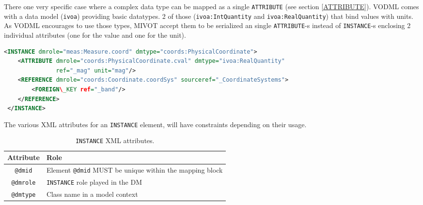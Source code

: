 There one very specific case where a complex data type can be mapped as a single \texttt{ATTRIBUTE} (see section \ref{ATTRIBUTE}). 
VODML comes with a data model (\texttt{ivoa}) providing basic datatypes. 2 of those (\texttt{ivoa:IntQuantity} 
and \texttt{ivoa:RealQuantity}) that bind values with units. 
As VODML encourages to use those types, MIVOT accept them to be serialized an single \texttt{ATTRIBUTE}-s
instead of \texttt{INSTANCE}-s enclosing 2 individual attributes (one for the value and one for the unit).

\begin{lstlisting}[caption={Example of complex data type (\texttt{ivoa:RealQuantity}) serialized 
as a single \texttt{ATTRIBUTE}  (see line~\ref{IVOA_snippet} in Appendix~\ref{appendix_A}).
The  attribute of type \texttt{ivoa:RealQuantity} is a shortcut for an 
\texttt{INSTANCE[@dmtype=ivoa:RealQuantity]} which has 2 attributes (value and unit)
},language=XML]
<INSTANCE dmrole="meas:Measure.coord" dmtype="coords:PhysicalCoordinate">
    <ATTRIBUTE dmrole="coords:PhysicalCoordinate.cval" dmtype="ivoa:RealQuantity" 
               ref="_mag" unit="mag"/>
    <REFERENCE dmrole="coords:Coordinate.coordSys" sourceref="_CoordinateSystems">
        <FOREIGN\_KEY ref="_band"/>
    </REFERENCE>
 </INSTANCE>
\end{lstlisting}   



The various XML attributes for an \texttt{INSTANCE} element, will have constraints depending on their usage.
\begin{table}[!htbp]
\small
\centering
\begin{tabulary}{\linewidth}{|c|J|}       
       \hline 
            \textbf{Attribute} & 
            \textbf {Role}\\
       \hline         \hline  
            \texttt{@dmid} & 
            Element  \texttt{@dmid}  MUST be unique within the mapping block  \\
        \hline 
            \texttt{@dmrole} & 
            \texttt{INSTANCE} role played in the DM \\
        \hline 
            \texttt{@dmtype} & 
            Class name in a model context\\
        \hline 
     \end{tabulary}
     \caption{\texttt{INSTANCE} XML attributes.} 
     \label{tbl:instance-att}
 \end{table}   
 


